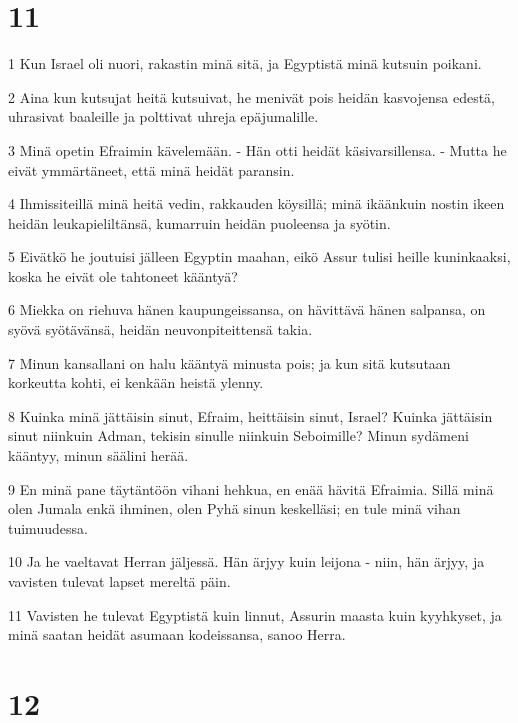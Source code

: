 \chapter{11}

\par 1 Kun Israel oli nuori, rakastin minä sitä, ja Egyptistä minä kutsuin poikani.
\par 2 Aina kun kutsujat heitä kutsuivat, he menivät pois heidän kasvojensa edestä, uhrasivat baaleille ja polttivat uhreja epäjumalille.
\par 3 Minä opetin Efraimin kävelemään. - Hän otti heidät käsivarsillensa. - Mutta he eivät ymmärtäneet, että minä heidät paransin.
\par 4 Ihmissiteillä minä heitä vedin, rakkauden köysillä; minä ikäänkuin nostin ikeen heidän leukapieliltänsä, kumarruin heidän puoleensa ja syötin.
\par 5 Eivätkö he joutuisi jälleen Egyptin maahan, eikö Assur tulisi heille kuninkaaksi, koska he eivät ole tahtoneet kääntyä?
\par 6 Miekka on riehuva hänen kaupungeissansa, on hävittävä hänen salpansa, on syövä syötävänsä, heidän neuvonpiteittensä takia.
\par 7 Minun kansallani on halu kääntyä minusta pois; ja kun sitä kutsutaan korkeutta kohti, ei kenkään heistä ylenny.
\par 8 Kuinka minä jättäisin sinut, Efraim, heittäisin sinut, Israel? Kuinka jättäisin sinut niinkuin Adman, tekisin sinulle niinkuin Seboimille? Minun sydämeni kääntyy, minun säälini herää.
\par 9 En minä pane täytäntöön vihani hehkua, en enää hävitä Efraimia. Sillä minä olen Jumala enkä ihminen, olen Pyhä sinun keskelläsi; en tule minä vihan tuimuudessa.
\par 10 Ja he vaeltavat Herran jäljessä. Hän ärjyy kuin leijona - niin, hän ärjyy, ja vavisten tulevat lapset mereltä päin.
\par 11 Vavisten he tulevat Egyptistä kuin linnut, Assurin maasta kuin kyyhkyset, ja minä saatan heidät asumaan kodeissansa, sanoo Herra.

\chapter{12}


